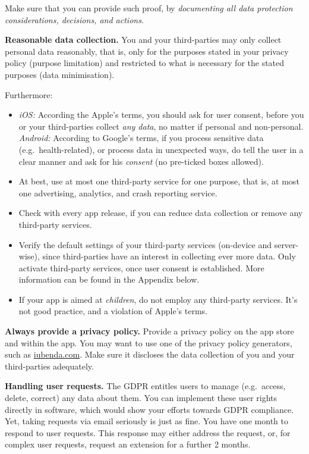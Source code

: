 \documentclass[
]{book}
\providecommand{\tightlist}{%
  \setlength{\itemsep}{0pt}\setlength{\parskip}{0pt}}
\begin{document}
Make sure that you can provide such proof, by \emph{documenting all data protection considerations, decisions, and actions}.

\textbf{Reasonable data collection.} You and your third-parties may only collect personal data reasonably, that is, only for the purposes stated in your privacy policy (purpose limitation) and restricted to what is necessary for the stated purposes (data minimisation).

Furthermore:

\begin{itemize}
\tightlist
\item
  \emph{iOS:} According the Apple's terms, you should ask for user consent, before you or your third-parties collect \emph{any data}, no matter if personal and non-personal.
  \emph{Android:} According to Google's terms, if you process sensitive data (e.g.~health-related), or process data in unexpected ways, do tell the user in a clear manner and ask for his \emph{consent} (no pre-ticked boxes allowed).
\item
  At best, use at most one third-party service for one purpose, that is, at most one advertising, analytics, and crash reporting service.
\item
  Check with every app release, if you can reduce data collection or remove any third-party services.
\item
  Verify the default settings of your third-party services (on-device and server-wise), since third-parties have an interest in collecting ever more data. Only activate third-party services, once user consent is established. More information can be found in the Appendix below.
\item
  If your app is aimed at \emph{children}, do not employ any third-party services. It's not good practice, and a violation of Apple's terms.
\end{itemize}

\textbf{Always provide a privacy policy.} Provide a privacy policy on the app store and within the app. You may want to use one of the privacy policy generators, such as \href{https://gdpr4devs.com/iubenda.com}{iubenda.com}. Make sure it discloses the data collection of you and your third-parties adequately.

\textbf{Handling user requests.} The GDPR entitles users to manage (e.g.~access, delete, correct) any data about them. You can implement these user rights directly in software, which would show your efforts towards GDPR compliance. Yet, taking requests via email seriously is just as fine. You have one month to respond to user requests. This response may either address the request, or, for complex user requests, request an extension for a further 2 months.
\end{document}
